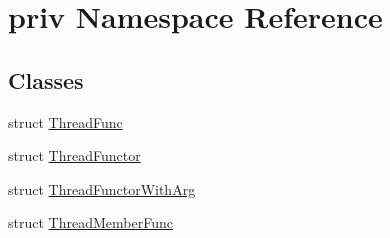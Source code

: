 \hypertarget{namespacepriv}{\section{priv Namespace Reference}
\label{namespacepriv}
}
\subsection*{Classes}
\begin{DoxyCompactItemize}
\item 
struct \hyperlink{structpriv_1_1_thread_func}{Thread\-Func}
\item 
struct \hyperlink{structpriv_1_1_thread_functor}{Thread\-Functor}
\item 
struct \hyperlink{structpriv_1_1_thread_functor_with_arg}{Thread\-Functor\-With\-Arg}
\item 
struct \hyperlink{structpriv_1_1_thread_member_func}{Thread\-Member\-Func}
\end{DoxyCompactItemize}
